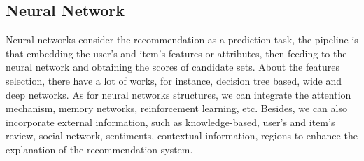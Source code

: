 \documentclass[10pt,twocolumn,letterpaper]{article}
\begin{document}
\subsection{Neural Network}
Neural networks consider the recommendation as a prediction task, the pipeline is that embedding the user's and item's features or attributes, then feeding to the neural network and obtaining the scores of candidate sets. About the features selection, there have a lot of works, for instance, decision tree based, wide and deep networks. As for neural networks structures, we can integrate the attention mechanism, memory networks, reinforcement learning, etc. Besides, we can also incorporate external information, such as knowledge-based, user's and item's review, social network, sentiments, contextual information, regions to enhance the explanation of the recommendation system. 
\end{document}
